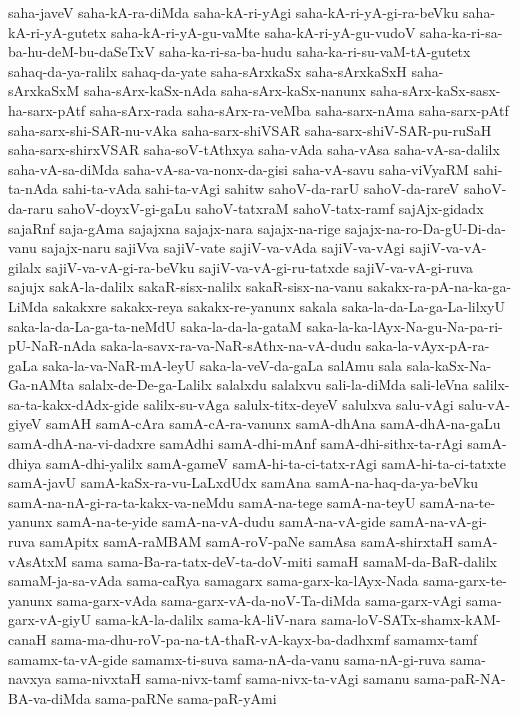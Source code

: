 {saha-javeV
saha-kA-ra-diMda
saha-kA-ri-yAgi
saha-kA-ri-yA-gi-ra-beVku
saha-kA-ri-yA-gutetx
saha-kA-ri-yA-gu-vaMte
saha-kA-ri-yA-gu-vudoV
saha-ka-ri-sa-ba-hu-deM-bu-daSeTxV
saha-ka-ri-sa-ba-hudu
saha-ka-ri-su-vaM-tA-gutetx
sahaq-da-ya-ralilx
sahaq-da-yate
saha-sArxkaSx
saha-sArxkaSxH
saha-sArxkaSxM
saha-sArx-kaSx-nAda
saha-sArx-kaSx-nanunx
saha-sArx-kaSx-sasx-ha-sarx-pAtf
saha-sArx-rada
saha-sArx-ra-veMba
saha-sarx-nAma
saha-sarx-pAtf
saha-sarx-shi-SAR-nu-vAka
saha-sarx-shiVSAR
saha-sarx-shiV-SAR-pu-ruSaH
saha-sarx-shirxVSAR
saha-soV-tAthxya
saha-vAda
saha-vAsa
saha-vA-sa-dalilx
saha-vA-sa-diMda
saha-vA-sa-va-nonx-da-gisi
saha-vA-savu
saha-viVyaRM
sahi-ta-nAda
sahi-ta-vAda
sahi-ta-vAgi
sahitw
sahoV-da-rarU
sahoV-da-rareV
sahoV-da-raru
sahoV-doyxV-gi-gaLu
sahoV-tatxraM
sahoV-tatx-ramf
sajAjx-gidadx
sajaRnf
saja-gAma
sajajxna
sajajx-nara
sajajx-na-rige
sajajx-na-ro-Da-gU-Di-da-vanu
sajajx-naru
sajiVva
sajiV-vate
sajiV-va-vAda
sajiV-va-vAgi
sajiV-va-vA-gilalx
sajiV-va-vA-gi-ra-beVku
sajiV-va-vA-gi-ru-tatxde
sajiV-va-vA-gi-ruva
sajujx
sakA-la-dalilx
sakaR-sisx-nalilx
sakaR-sisx-na-vanu
sakakx-ra-pA-na-ka-ga-LiMda
sakakxre
sakakx-reya
sakakx-re-yanunx
sakala
saka-la-da-La-ga-La-lilxyU
saka-la-da-La-ga-ta-neMdU
saka-la-da-la-gataM
saka-la-ka-lAyx-Na-gu-Na-pa-ri-pU-NaR-nAda
saka-la-savx-ra-va-NaR-sAthx-na-vA-dudu
saka-la-vAyx-pA-ra-gaLa
saka-la-va-NaR-mA-leyU
saka-la-veV-da-gaLa
salAmu
sala
sala-kaSx-Na-Ga-nAMta
salalx-de-De-ga-Lalilx
salalxdu
salalxvu
sali-la-diMda
sali-leVna
salilx-sa-ta-kakx-dAdx-gide
salilx-su-vAga
salulx-titx-deyeV
salulxva
salu-vAgi
salu-vA-giyeV
samAH
samA-cAra
samA-cA-ra-vanunx
samA-dhAna
samA-dhA-na-gaLu
samA-dhA-na-vi-dadxre
samAdhi
samA-dhi-mAnf
samA-dhi-sithx-ta-rAgi
samA-dhiya
samA-dhi-yalilx
samA-gameV
samA-hi-ta-ci-tatx-rAgi
samA-hi-ta-ci-tatxte
samA-javU
samA-kaSx-ra-vu-LaLxdUdx
samAna
samA-na-haq-da-ya-beVku
samA-na-nA-gi-ra-ta-kakx-va-neMdu
samA-na-tege
samA-na-teyU
samA-na-te-yanunx
samA-na-te-yide
samA-na-vA-dudu
samA-na-vA-gide
samA-na-vA-gi-ruva
samApitx
samA-raMBAM
samA-roV-paNe
samAsa
samA-shirxtaH
samA-vAsAtxM
sama
sama-Ba-ra-tatx-deV-ta-doV-miti
samaH
samaM-da-BaR-dalilx
samaM-ja-sa-vAda
sama-caRya
samagarx
sama-garx-ka-lAyx-Nada
sama-garx-te-yanunx
sama-garx-vAda
sama-garx-vA-da-noV-Ta-diMda
sama-garx-vAgi
sama-garx-vA-giyU
sama-kA-la-dalilx
sama-kA-liV-nara
sama-loV-SATx-shamx-kAM-canaH
sama-ma-dhu-roV-pa-na-tA-thaR-vA-kayx-ba-dadhxmf
samamx-tamf
samamx-ta-vA-gide
samamx-ti-suva
sama-nA-da-vanu
sama-nA-gi-ruva
sama-navxya
sama-nivxtaH
sama-nivx-tamf
sama-nivx-ta-vAgi
samanu
sama-paR-NA-BA-va-diMda
sama-paRNe
sama-paR-yAmi
}
